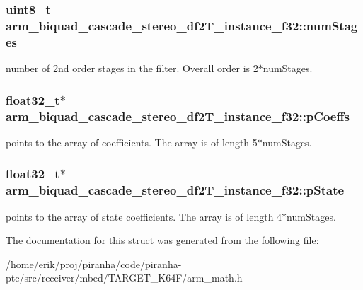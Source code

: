 \subsubsection[{\texorpdfstring{num\+Stages}{numStages}}]{\setlength{\rightskip}{0pt plus 5cm}uint8\+\_\+t arm\+\_\+biquad\+\_\+cascade\+\_\+stereo\+\_\+df2\+T\+\_\+instance\+\_\+f32\+::num\+Stages}\hypertarget{structarm__biquad__cascade__stereo__df2T__instance__f32_a5655328252da5c2c2425ceed253bc4f1}{}\label{structarm__biquad__cascade__stereo__df2T__instance__f32_a5655328252da5c2c2425ceed253bc4f1}
number of 2nd order stages in the filter. Overall order is 2$\ast$num\+Stages. 
\subsubsection[{\texorpdfstring{p\+Coeffs}{pCoeffs}}]{\setlength{\rightskip}{0pt plus 5cm}float32\+\_\+t$\ast$ arm\+\_\+biquad\+\_\+cascade\+\_\+stereo\+\_\+df2\+T\+\_\+instance\+\_\+f32\+::p\+Coeffs}\hypertarget{structarm__biquad__cascade__stereo__df2T__instance__f32_a58b15644de62a632c5e9d4a563569dc6}{}\label{structarm__biquad__cascade__stereo__df2T__instance__f32_a58b15644de62a632c5e9d4a563569dc6}
points to the array of coefficients. The array is of length 5$\ast$num\+Stages. 
\subsubsection[{\texorpdfstring{p\+State}{pState}}]{\setlength{\rightskip}{0pt plus 5cm}float32\+\_\+t$\ast$ arm\+\_\+biquad\+\_\+cascade\+\_\+stereo\+\_\+df2\+T\+\_\+instance\+\_\+f32\+::p\+State}\hypertarget{structarm__biquad__cascade__stereo__df2T__instance__f32_a2cb00048bb1fe957a03c1ff56dfaf8f0}{}\label{structarm__biquad__cascade__stereo__df2T__instance__f32_a2cb00048bb1fe957a03c1ff56dfaf8f0}
points to the array of state coefficients. The array is of length 4$\ast$num\+Stages. 

The documentation for this struct was generated from the following file\+:\begin{DoxyCompactItemize}
\item 
/home/erik/proj/piranha/code/piranha-\/ptc/src/receiver/mbed/\+T\+A\+R\+G\+E\+T\+\_\+\+K64\+F/arm\+\_\+math.\+h\end{DoxyCompactItemize}
